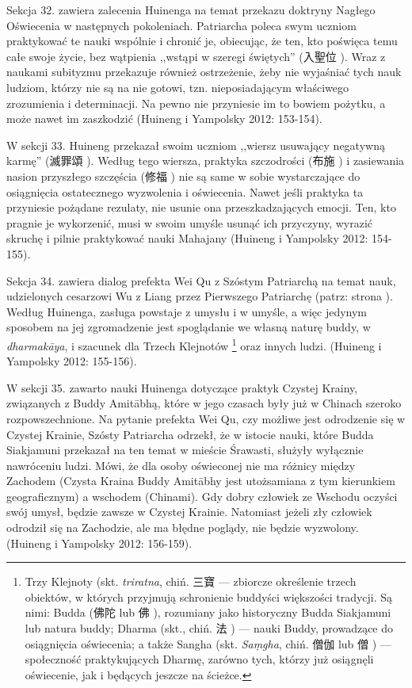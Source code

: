 Sekcja 32. zawiera zalecenia Huinenga na temat przekazu doktryny Nagłego Oświecenia w następnych pokoleniach.
Patriarcha poleca swym uczniom praktykować te nauki wspólnie i chronić je, obiecując, że ten, kto poświęca temu całe swoje życie, bez wątpienia ,,wstąpi w szeregi świętych'' (入聖位 ).
Wraz z naukami subityzmu przekazuje również ostrzeżenie, żeby nie wyjaśniać tych nauk ludziom, którzy nie są na nie gotowi, tzn. nieposiadającym właściwego zrozumienia i determinacji.
Na pewno nie przyniesie im to bowiem pożytku, a może nawet im zaszkodzić
(Huineng i Yampolsky 2012: 153-154).

W sekcji 33. Huineng przekazał swoim uczniom ,,wiersz usuwający negatywną karmę'' (滅罪頌 ).
Według tego wiersza, praktyka szczodrości (布施 ) i zasiewania nasion przyszłego szczęścia (修福 ) nie są same w sobie wystarczające do osiągnięcia ostatecznego wyzwolenia i oświecenia.
Nawet jeśli praktyka ta przyniesie pożądane rezulaty, nie usunie ona przeszkadzających emocji.
Ten, kto pragnie je wykorzenić, musi w swoim umyśle usunąć ich przyczyny, wyrazić skruchę i pilnie praktykować nauki Mahajany
(Huineng i Yampolsky 2012: 154-155).

Sekcja 34. zawiera dialog prefekta Wei Qu z Szóstym Patriarchą na temat nauk, udzielonych cesarzowi Wu z Liang przez Pierwszego Patriarchę (patrz: strona \pageref{LiangWuDi}).
Według Huinenga, zasługa powstaje z umysłu i w umyśle, a więc jedynym sposobem na jej zgromadzenie jest spoglądanie we własną naturę buddy, w \textit{dharmakāya}, i szacunek dla Trzech Klejnotów%
\footnote{Trzy Klejnoty (skt. \textit{triratna}, chiń. 三寶  --- zbiorcze określenie trzech obiektów, w których przyjmują schronienie buddyści większości tradycji. Są nimi: Budda (佛陀  lub 佛 ), rozumiany jako historyczny Budda Siakjamuni lub natura buddy; Dharma (skt., chiń. 法 ) --- nauki Buddy, prowadzące do osiągnięcia oświecenia; a także Sangha (skt. \textit{Sa\d{m}gha}, chiń. 僧伽  lub 僧 ) --- społeczność praktykujących Dharmę, zarówno tych, którzy już osiągnęli oświecenie, jak i będących jeszcze na ścieżce.}
oraz innych ludzi. %
(Huineng i Yampolsky 2012: 155-156).

W sekcji 35. zawarto nauki Huinenga dotyczące praktyk Czystej Krainy, związanych z Buddy Amitābhą, które w jego czasach były już w Chinach szeroko rozpowszechnione.
Na pytanie prefekta Wei Qu, czy możliwe jest odrodzenie się w Czystej Krainie, Szósty Patriarcha odrzekł, że w istocie nauki, które Budda Siakjamuni przekazał na ten temat w mieście Śrawasti, służyły wyłącznie nawróceniu ludzi.
Mówi, że dla osoby oświeconej nie ma różnicy między Zachodem (Czysta Kraina Buddy Amitābhy jest utożsamiana z tym kierunkiem geograficznym) a wschodem (Chinami).
Gdy dobry człowiek ze Wschodu oczyści swój umysł, będzie zawsze w Czystej Krainie.
Natomiast jeżeli zły człowiek odrodził się na Zachodzie, ale ma błędne poglądy, nie będzie wyzwolony.
(Huineng i Yampolsky 2012: 156-159).

